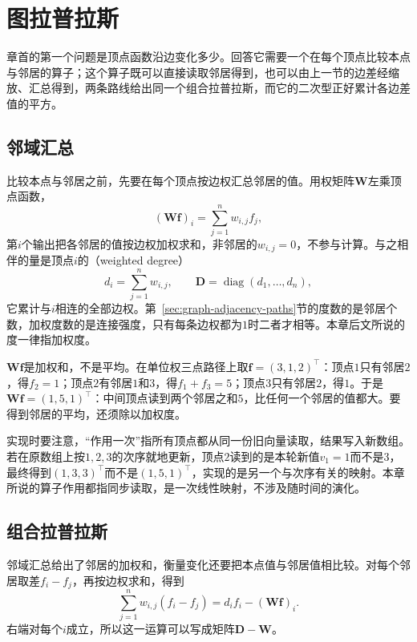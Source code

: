 
\section{图拉普拉斯}
\label{sec:graph-laplacian}

章首的第一个问题是顶点函数沿边变化多少。回答它需要一个在每个顶点比较本点与邻居的算子；这个算子既可以直接读取邻居得到，也可以由上一节的边差经缩放、汇总得到，两条路线给出同一个组合拉普拉斯，而它的二次型正好累计各边差值的平方。

\subsection{邻域汇总}
\label{sec:graph-spec-neighborhood-aggregation}

比较本点与邻居之前，先要在每个顶点按边权汇总邻居的值。用权矩阵$\bm W$左乘顶点函数，
\[
 (\bm W\bm f)_i=\sum_{j=1}^nw_{i,j}f_j ,
\]
第$i$个输出把各邻居的值按边权加权求和，非邻居的$w_{i,j}=0$，不参与计算。与之相伴的量是顶点$i$的（weighted degree）
\[
 d_i=\sum_{j=1}^nw_{i,j},\qquad \bm D=\operatorname{diag}(d_1,\ldots,d_n),
\]
它累计与$i$相连的全部边权。第~\ref{sec:graph-adjacency-paths}节的度数的是邻居个数，加权度数的是连接强度，只有每条边权都为$1$时二者才相等。本章后文所说的度一律指加权度。

$\bm W\bm f$是加权和，不是平均。在单位权三点路径上取$\bm f=(3,1,2)^{\top}$：顶点$1$只有邻居$2$，得$f_2=1$；顶点$2$有邻居$1$和$3$，得$f_1+f_3=5$；顶点$3$只有邻居$2$，得$1$。于是$\bm W\bm f=(1,5,1)^{\top}$：中间顶点读到两个邻居之和$5$，比任何一个邻居的值都大。要得到邻居的平均，还须除以加权度。

实现时要注意，“作用一次”指所有顶点都从同一份旧向量读取，结果写入新数组。若在原数组上按$1,2,3$的次序就地更新，顶点$2$读到的是本轮新值$v_1=1$而不是$3$，最终得到$(1,3,3)^{\top}$而不是$(1,5,1)^{\top}$，实现的是另一个与次序有关的映射。本章所说的算子作用都指同步读取，是一次线性映射，不涉及随时间的演化。

\subsection{组合拉普拉斯}
\label{sec:graph-spec-combinatorial-laplacian}

邻域汇总给出了邻居的加权和，衡量变化还要把本点值与邻居值相比较。对每个邻居取差$f_i-f_j$，再按边权求和，得到
\[
 \sum_{j=1}^nw_{i,j}(f_i-f_j)=d_if_i-(\bm W\bm f)_i .
\]
右端对每个$i$成立，所以这一运算可以写成矩阵$\bm D-\bm W$。

